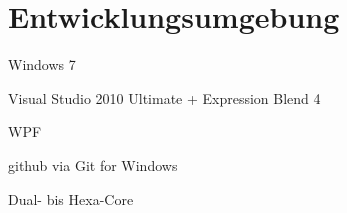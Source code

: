 \section{Entwicklungsumgebung}

\begin{description}[style=multiline,leftmargin=4.5cm]
	\item[Betriebssystem] Windows 7
	\item[Entwicklungsumgebung] Visual Studio 2010 Ultimate + Expression Blend 4
	\item[UI-Bibliothek] WPF
	\item[Versionierung] github via Git for Windows
	\item[Verfügbare Hardware] Dual- bis Hexa-Core
\end{description}
